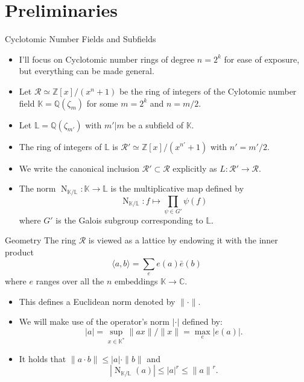\documentclass[presentation,smaller]{beamer}
\newcommand{\cR}{\ensuremath{\mathcal{R}}\xspace}
\newcommand{\Z}{\ensuremath{\mathbb Z}\xspace}
\newcommand{\K}{\ensuremath{\mathbb K}\xspace}
\renewcommand{\L}{\ensuremath{\mathbb L}\xspace}
\newcommand{\Q}{\ensuremath{\mathbb Q}\xspace}
\DeclareMathOperator{\Norm}{N}
\begin{document}
\section{Preliminaries}
\label{sec:org90e24f8}

\begin{frame}[label={sec:org0d52ef9}]{Cyclotomic Number Fields and Subfields}
\begin{itemize}
\item I’ll focus on Cyclotomic number rings of degree \(n = 2^k\) for ease of exposure, but everything can be made general.

\item Let \(\cR ≃ \Z[x]/(x^{n}+1)\) be the ring of integers of the Cylotomic number field \(\K = \Q(ζ_m)\) for some \(m=2^k\) and \(n = m/2\).

\item Let \(\L = \Q(ζ_{m'})\) with \(m' | m\) be a subfield of \(\K\).

\item The ring of integers of \(\L\) is \(\cR' ≃ \Z[x]/(x^{n'} + 1)\) with \(n' = m'/2\).

\item We write the canonical inclusion \(\cR' \subset \cR\) explicitly as \(L : \cR' \rightarrow \cR\).

\item The norm \(\Norm_{\K/\L}: \K \rightarrow \L\) is the multiplicative map defined by \[\Norm_{\K/\L} : f \mapsto  \prod_{\psi \in G'} \psi(f)\] where \(G'\) is the Galois subgroup corresponding to \(\L\).
\end{itemize}
\end{frame}

\begin{frame}[label={sec:org51c4c38}]{Geometry}
The ring \(\cR\) is viewed as a lattice by endowing it with the inner product \[\langle a , b\rangle = \sum_e e(a) \bar e(b)\] where \(e\) ranges over all the \(n\) embeddings \(\mathbb K \rightarrow \mathbb C\). 

\begin{itemize}
\item This defines a Euclidean norm denoted by \(\| \cdot \|\).

\item We will make use of the operator's norm \(|\cdot|\) defined by: \[|a| = \sup_{x \in \K^*} \|ax\|/\|x\| = \max_e |e(a)|.\]

\item It holds that \(\| a⋅b \| ≤ |a| ⋅ \| b \|\) and \[|\Norm_{\K/\L}(a)| ≤ {|a|}^r ≤ {\|a\|}^r.\]
\end{itemize}
\end{frame}
\end{document}
